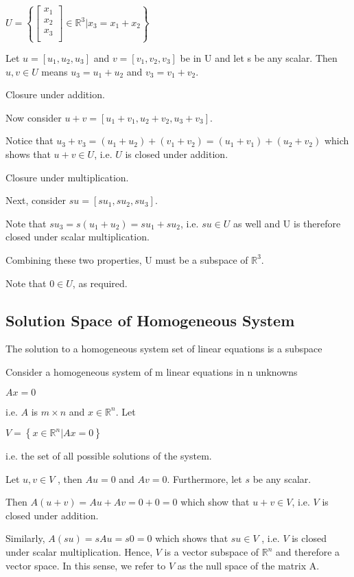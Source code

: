 \documentclass{extarticle}
\begin{document}
$U=\left\{
{\left[\begin{matrix}x_1\\x_2\\x_3\\\end{matrix}\right]}
\in \mathbb{R}^3
\vert
x_3=x_1 + x_2
 \right\}$

Let $u = [u_1, u_2, u_3]$ and $v = [v_1, v_2, v_3]$ be in U and let s be any scalar. Then $u, v \in U$ means $u_3 = u_1 + u_2$ and $v_3 = v_1 + v_2$.

Closure under addition. 

Now consider $u+v = [u_1+v_1, u_2+v_2, u_3+v_3]$.

Notice that $u_3+v_3 = (u_1+u_2)+(v_1+v_2) = (u_1 + v_1) + (u_2 + v_2)$ which shows that $u + v \in U$, i.e. $U$ is closed under addition.

Closure under multiplication.

Next, consider $su = [su_1, su_2, su_3]$.

Note that $su_3 = s(u_1 + u_2) = su_1 + su_2$, i.e. $su \in U$ as well and U is therefore closed under scalar multiplication.

Combining these two properties, U must be a subspace of ${\mathbb{R}}^3$.



Note that $0 \in U$, as required.





\subsection{Solution Space of Homogeneous System}
The solution to a homogeneous system set of linear equations is a subspace
\begin{tcolorbox}[enhanced jigsaw,sharp corners,coltext=black,colback=BurntOrange!25!white,boxrule=0pt,breakable,size=minimal]
Consider a homogeneous system of m linear equations in n unknowns

$Ax=0$

i.e. $A$ is $m \times n$ and $x \in{\mathbb{R}}^n$. Let

$V=\left\{
x
\in \mathbb{R}^n
\vert
Ax=0
 \right\}$


i.e. the set of all possible solutions of the system.

Let $u, v \in V$ , then $Au = 0$ and $Av = 0$. Furthermore, let $s$ be any scalar.

Then $A(u + v) = Au + Av = 0 + 0 = 0$ which show that $u + v \in V$, i.e. $V$ is closed under addition.

Similarly, $A(su) = sAu = s0 = 0$ which shows that $su \in V$ , i.e. $V$ is closed under scalar multiplication.
Hence, $V$ is a vector subspace of ${\mathbb{R}}^n$ and therefore a vector space. In this sense, we refer to $V$ as the null space of the matrix A.
\end{tcolorbox}
\end{document}
